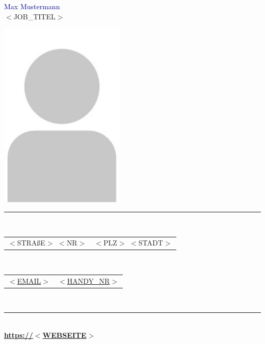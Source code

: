 \documentclass[a4paper,12pt]{article}
\begin{document}
\begin{titlepage}
    \pagestyle{empty}
    \centering
    
    \vspace*{2cm}

    {\fontsize{42}{46}\selectfont \textcolor{darkblue}{Max Mustermann}}\\[8pt]
    {\Large {\textcolor{trustblue}{$<$JOB\_TITEL$>$}}}\\[0.3cm]

    \vspace{0.5cm}

    \includegraphics[width=6cm]{../assets/placeholder.jpeg}\\[1.5cm]
    
    \color{lightgray}\rule{0.9\textwidth}{0.6pt}\\[0.25cm]
    \color{black}
    
    \begin{tabular}{c|c}
        $<$STRAßE$>$ $<$NR$>$ & $<$PLZ$>$ $<$STADT$>$ \\
    \end{tabular} \\[0.3cm]
    
    \begin{tabular}{c|c}
        \href{mailto:$<$EMAIL$>$}{$<$EMAIL$>$} & \href{tel:$<$HANDY\_NR$>$}{$<$HANDY\_NR$>$} \\
    \end{tabular} \\[0.1cm]
    
    \color{lightgray}\rule{0.9\textwidth}{0.6pt}\\[0.5cm]
    
    \textbf{\textcolor{trustblue}{\href{https://$<$WEBSEITE$>$}{https://$<$WEBSEITE$>$}}} \\
    
    \vfill
    
\end{titlepage}
\end{document}
